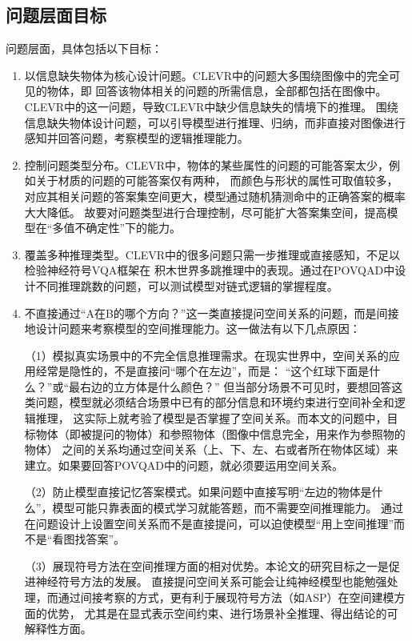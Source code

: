 \subsection{问题层面目标}
问题层面，具体包括以下目标：
\begin{enumerate}[nosep]
\item 以信息缺失物体为核心设计问题。CLEVR中的问题大多围绕图像中的完全可见的物体，即
回答该物体相关的问题的所需信息，全部都包括在图像中。CLEVR中的这一问题，导致CLEVR中缺少信息缺失的情境下的推理。
围绕信息缺失物体设计问题，可以引导模型进行推理、归纳，而非直接对图像进行感知并回答问题，考察模型的逻辑推理能力。
\item 控制问题类型分布。CLEVR中，物体的某些属性的问题的可能答案太少，例如关于材质的问题的可能答案仅有两种，
而颜色与形状的属性可取值较多，对应其相关问题的答案集空间更大，模型通过随机猜测命中的正确答案的概率大大降低。
故要对问题类型进行合理控制，尽可能扩大答案集空间，提高模型在“多值不确定性”下的能力。
\item 覆盖多种推理类型。CLEVR中的很多问题只需一步推理或直接感知，不足以检验神经符号VQA框架在
积木世界多跳推理中的表现。通过在POVQAD中设计不同推理跳数的问题，可以测试模型对链式逻辑的掌握程度。
\item 不直接通过“A在B的哪个方向？”这一类直接提问空间关系的问题，而是间接地设计问题来考察模型的空间推理能力。这一做法有以下几点原因：

（1）模拟真实场景中的不完全信息推理需求。在现实世界中，空间关系的应用经常是隐性的，不是直接问“哪个在左边”，而是：
“这个红球下面是什么？”或“最右边的立方体是什么颜色？”
但当部分场景不可见时，要想回答这类问题，模型就必须结合场景中已有的部分信息和环境约束进行空间补全和逻辑推理，
这实际上就考验了模型是否掌握了空间关系。而本文的问题中，目标物体（即被提问的物体）和参照物体（图像中信息完全，用来作为参照物的物体）
之间的关系均通过空间关系（上、下、左、右或者所在物体区域）来建立。如果要回答POVQAD中的问题，就必须要运用空间关系。

（2）防止模型直接记忆答案模式。如果问题中直接写明“左边的物体是什么”，模型可能只靠表面的模式学习就能答题，而不需要空间推理能力。
通过在问题设计上设置空间关系而不是直接提问，可以迫使模型“用上空间推理”而不是“看图找答案”。

（3）展现符号方法在空间推理方面的相对优势。本论文的研究目标之一是促进神经符号方法的发展。
直接提问空间关系可能会让纯神经模型也能勉强处理，而通过间接考察的方式，更有利于展现符号方法（如ASP）在空间建模方面的优势，
尤其是在显式表示空间约束、进行场景补全推理、得出结论的可解释性方面。
\end{enumerate}
